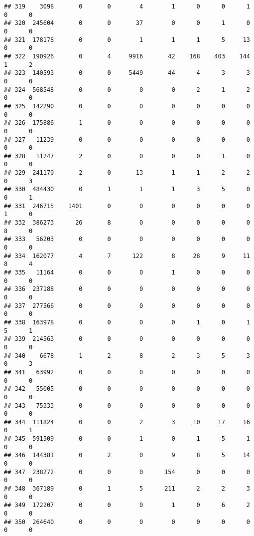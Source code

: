\documentclass[
]{article}
\begin{document}
\begin{verbatim}
## 319    3098       0       0        4        1      0      0      1     0      0
## 320  245604       0       0       37        0      0      1      0     0      0
## 321  178178       0       0        1        1      1      5     13     0      0
## 322  190926       0       4     9916       42    168    403    144     1      2
## 323  140593       0       0     5449       44      4      3      3     0      0
## 324  568548       0       0        0        0      2      1      2     0      0
## 325  142290       0       0        0        0      0      0      0     0      0
## 326  175886       1       0        0        0      0      0      0     0      0
## 327   11239       0       0        0        0      0      0      0     0      0
## 328   11247       2       0        0        0      0      1      0     0      0
## 329  241170       2       0       13        1      1      2      2     0      3
## 330  484430       0       1        1        1      3      5      0     0      1
## 331  246715    1401       0        0        0      0      0      0     1      0
## 332  386273      26       8        0        0      0      0      0     8      0
## 333   56203       0       0        0        0      0      0      0     0      0
## 334  162077       4       7      122        8     28      9     11     8      4
## 335   11164       0       0        0        1      0      0      0     0      0
## 336  237188       0       0        0        0      0      0      0     0      0
## 337  277566       0       0        0        0      0      0      0     0      0
## 338  163978       0       0        0        0      1      0      1     5      1
## 339  214563       0       0        0        0      0      0      0     0      0
## 340    6678       1       2        8        2      3      5      3     0      3
## 341   63992       0       0        0        0      0      0      0     0      0
## 342   55005       0       0        0        0      0      0      0     0      0
## 343   75333       0       0        0        0      0      0      0     0      0
## 344  111824       0       0        2        3     10     17     16     0      1
## 345  591509       0       0        1        0      1      5      1     0      0
## 346  144381       0       2        0        9      8      5     14     0      0
## 347  238272       0       0        0      154      0      0      0     0      0
## 348  367189       0       1        5      211      2      2      3     0      0
## 349  172207       0       0        0        1      0      6      2     0      0
## 350  264640       0       0        0        0      0      0      0     0      0

\end{verbatim}
\end{document}

